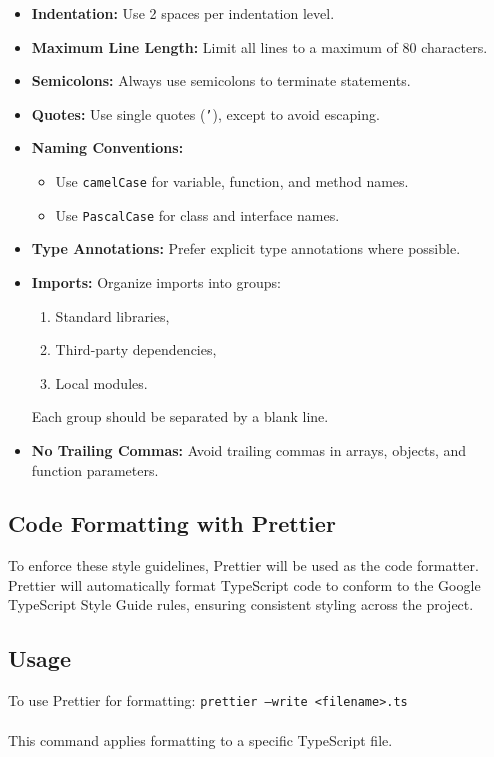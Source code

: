 \documentclass{article}
\begin{document}
\begin{itemize}
    \item \textbf{Indentation:} Use 2 spaces per indentation level.
    \item \textbf{Maximum Line Length:} Limit all lines to a maximum of 80 characters.
    \item \textbf{Semicolons:} Always use semicolons to terminate statements.
    \item \textbf{Quotes:} Use single quotes (\texttt{'}), except to avoid escaping.
    \item \textbf{Naming Conventions:}
    \begin{itemize}
        \item Use \texttt{camelCase} for variable, function, and method names.
        \item Use \texttt{PascalCase} for class and interface names.
    \end{itemize}
    \item \textbf{Type Annotations:} Prefer explicit type annotations where possible.
    \item \textbf{Imports:} Organize imports into groups:
    \begin{enumerate}
        \item Standard libraries,
        \item Third-party dependencies,
        \item Local modules.
    \end{enumerate}
    Each group should be separated by a blank line.
    \item \textbf{No Trailing Commas:} Avoid trailing commas in arrays, objects, and function parameters.
\end{itemize}

\subsection*{Code Formatting with Prettier}

To enforce these style guidelines, Prettier will be used as the code formatter. Prettier will automatically format TypeScript code to conform to the Google TypeScript Style Guide rules, ensuring consistent styling across the project.

\subsection*{Usage}
To use Prettier for formatting:  \texttt{prettier --write <filename>.ts}\\\\
This command applies formatting to a specific TypeScript file.
\end{document}
